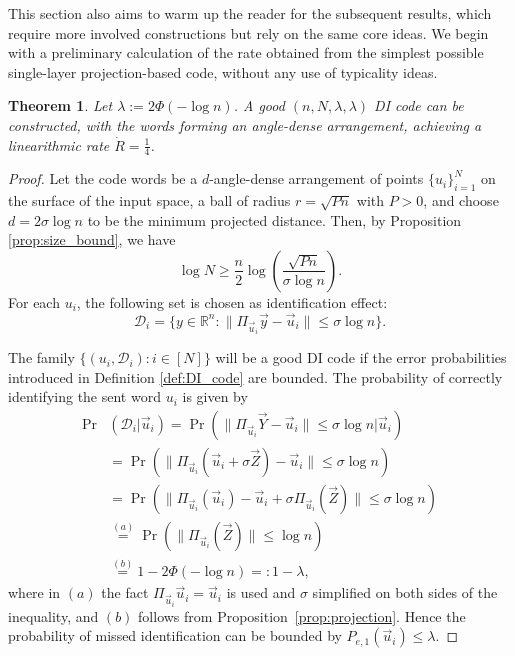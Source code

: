 \documentclass[10pt,conference]{IEEEtran}
\newtheorem{theorem}{Theorem}
\newcommand{\1}{\mathds{1}}
\newcommand{\RR}{\mathbb{R}}
\newcommand{\cD}{\mathcal{D}}
\begin{document}
This section also aims to warm up the reader for the subsequent results, which require more involved constructions but rely on the same core ideas. We begin with a preliminary calculation of the rate obtained from the simplest possible single-layer projection-based code, without any use of typicality ideas.

\begin{theorem}\label{thm:single_layer}
Let $\lambda:=2\Phi(-\log n)$. A good $(n,N,\lambda,\lambda)$ DI code can be constructed, with the words forming an angle-dense arrangement, achieving a linearithmic rate $\dot{R}=\frac14$.
\end{theorem}
\begin{proof}
Let the code words be a $d$-angle-dense arrangement of points $\{u_i\}_{i=1}^N$ on the surface of the input space, a ball of radius $r=\sqrt{Pn}$ with $P>0$, and choose $d=2\sigma\log n$ to be the minimum projected distance. Then, by Proposition \ref{prop:size_bound}, we have 
\begin{equation}\label{eq:single-layer-size}
\log N\geq\frac{n}{2}\log\left(\frac{\sqrt{Pn}}{\sigma\log n}\right).
\end{equation}
For each $u_i$, the following set is chosen as identification effect:
\begin{equation}\label{eq:dec_single_layer}
\cD_i=\{y\in\RR^n:\|\Pi_{\vec{u}_i}\vec{y}-\vec{u}_i\|\leq \sigma\log n\}.
\end{equation}

The family $\{(u_i,\cD_i):i\in[N]\}$ will be a good DI code if the error probabilities introduced in Definition \ref{def:DI_code} are bounded. The probability of correctly identifying the sent word $u_i$ is given by
\begin{equation}\label{eq:Proj_error1}
\begin{split}
\Pr&(\cD_i|\vec{u}_i)=\Pr\left(\|\Pi_{\vec{u}_i}\vec{Y}-\vec{u}_i\|\leq\sigma\log n|\vec{u}_i\right)\\
&=\Pr\left(\|\Pi_{\vec{u}_i}(\vec{u}_i+\sigma\vec{Z})-\vec{u}_i\|\leq\sigma\log n\right)\\
&=\Pr\left(\|\Pi_{\vec{u}_i}(\vec{u}_i)-\vec{u}_i+\sigma \Pi_{\vec{u}_i}(\vec{Z})\|\leq\sigma\log n\right)\\
&\stackrel{(a)}{=}\Pr\left(\|\Pi_{\vec{u}_i}(\vec{Z})\|\leq\log n\right)\\
&\stackrel{(b)}{=}1-2\Phi(-\log n)=:1-\lambda,
\end{split}
\end{equation}
where in $(a)$ the fact $\Pi_{\vec{u}_i}\vec{u}_i=\vec{u}_i$ is used and $\sigma$ simplified on both sides of the inequality, and $(b)$ follows from Proposition~\ref{prop:projection}. Hence the probability of missed identification can be bounded by $P_{e,1}(\vec{u}_i)\leq \lambda$.


\end{proof}
\end{document}
